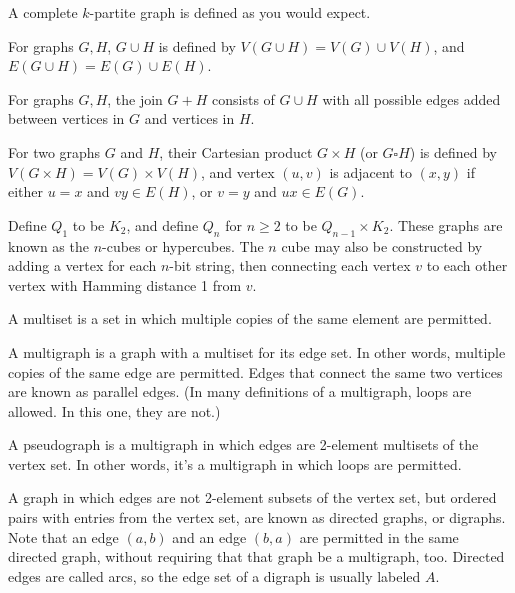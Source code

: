 \documentclass{article}
\begin{document}
    A complete $k$-partite graph is defined as you would expect.

\medskip
{}

    For graphs $G, H$, $G \cup H$ is defined by $V(G \cup H) = V(G) \cup V(H)$, and $E(G \cup H) = E(G) \cup E(H)$.

\medskip
{}

    For graphs $G, H$, the join $G + H$ consists of $G \cup H$ with all possible edges added between vertices in $G$ and vertices in $H$.

\medskip
{}

    For two graphs $G$ and $H$, their Cartesian product $G \times H$ (or $G \square H$) is defined by $V(G \times H) = V(G) \times V(H)$, and vertex $(u,v)$ is adjacent to $(x,y)$ if either $u=x$ and $vy \in E(H)$, or $v=y$ and $ux \in E(G)$.

\medskip
{}

    Define $Q_1$ to be $K_2$, and define $Q_n$ for $n \geq 2$ to be $Q_{n-1} \times K_2$.
    These graphs are known as the $n$-cubes or hypercubes.
    The $n$ cube may also be constructed by adding a vertex for each $n$-bit string, then connecting each vertex $v$ to each other vertex with Hamming distance 1 from $v$.

\medskip
{}

    A multiset is a set in which multiple copies of the same element are permitted.

\medskip
{}

    A multigraph is a graph with a multiset for its edge set. In other words, multiple copies of the same edge are permitted. Edges that connect the same two vertices are known as parallel edges. (In many definitions of a multigraph, loops are allowed. In this one, they are not.)

\medskip
{}

    A pseudograph is a multigraph in which edges are 2-element multisets of the vertex set. In other words, it's a multigraph in which loops are permitted.

\medskip
{}

    A graph in which edges are not 2-element subsets of the vertex set, but ordered pairs with entries from the vertex set, are known as directed graphs, or digraphs. Note that an edge $(a,b)$ and an edge $(b,a)$ are permitted in the same directed graph, without requiring that that graph be a multigraph, too. Directed edges are called arcs, so the edge set of a digraph is usually labeled $A$.
\end{document}
